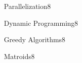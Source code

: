 \documentclass[a4paper]{article}
\begin{document}
\header

\begin{problem}{Parallelization}{8}
\end{problem}


\begin{problem}{Dynamic Programming}{8}
\begin{acode}
\end{acode}
\end{problem}

\begin{problem}{Greedy Algorithms}{8}
\begin{acode}
\end{acode}
\end{problem}

\begin{problem}{Matroids}{8}
\begin{acode}
\end{acode}
\end{problem}
\end{document}
